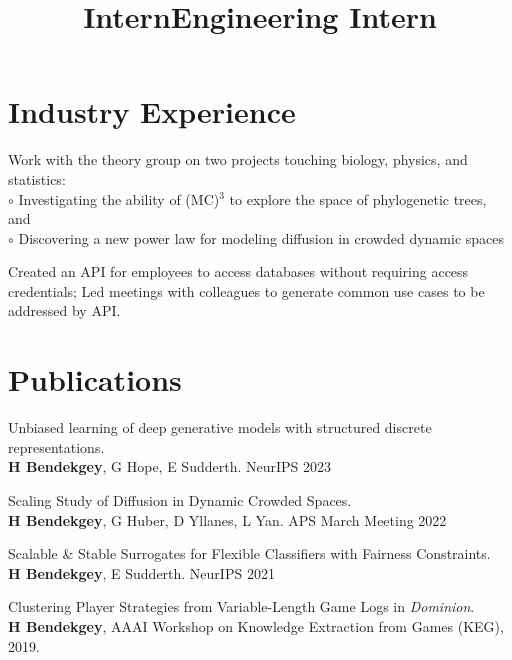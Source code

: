 \documentclass[margin]{res}
\begin{document}
\begin{resume}
\begin{position}
\end{position}

\section{Industry Experience}

\title{\textbf{Intern}}
\begin{position}
Work with the theory group on two projects touching biology, physics, and statistics:\\
$\circ$ Investigating the ability of (MC)$^3$ to explore the space of phylogenetic trees, and \\
$\circ$ Discovering a new power law for modeling diffusion in crowded dynamic spaces
\end{position}

\location{}
\title{\textbf{Engineering Intern}}
\begin{position}
Created an API for employees to access databases without requiring access credentials;
Led meetings with colleagues to generate common use cases to be addressed by API.\end{position}


\newpage

\section{Publications}
\par
Unbiased learning of deep generative models with structured discrete representations. \\ \textbf{H Bendekgey}, G Hope, E Sudderth. NeurIPS 2023

Scaling Study of Diffusion in Dynamic Crowded Spaces. \\\textbf{H Bendekgey}, G Huber, D Yllanes, L Yan. APS March Meeting 2022

Scalable \& Stable Surrogates for Flexible Classifiers with Fairness Constraints. \\ \textbf{H Bendekgey}, E Sudderth. NeurIPS 2021

Clustering Player Strategies from Variable-Length Game Logs in \emph{Dominion}.\\ \textbf{H Bendekgey}, AAAI Workshop on Knowledge Extraction from Games (KEG), 2019.


\end{resume}
\end{document}
